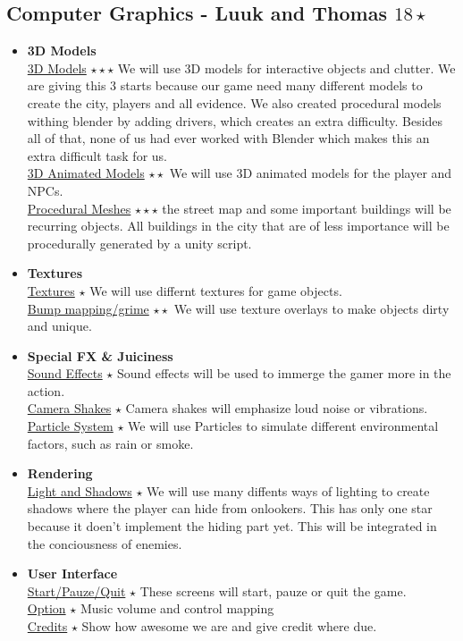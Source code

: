 \documentclass{article}
\begin{document}
		\subsection{Computer Graphics - Luuk and Thomas $18 \star$}
			\begin{itemize}
				\item \textbf{3D Models}\\
					\underline{3D Models} $\star \star \star$ We will use 3D models for interactive objects and clutter. We are giving this 3 starts because our game need many different models to create the city, players and all evidence. We also created procedural models withing blender by adding drivers, which creates an extra difficulty. Besides all of that, none of us had ever worked with Blender which makes this an extra difficult task for us.\\
					\underline{3D Animated Models} $\star \star$  We will use 3D animated models for the player and NPCs.\\
					\underline{Procedural Meshes} $\star \star \star$  the street map and some important buildings will be recurring objects. All buildings in the city that are of less importance will be procedurally generated by a unity script.
				\item \textbf{Textures}\\
					\underline{Textures} $\star$ We will use differnt textures for game objects.\\
					\underline{Bump mapping/grime} $\star \star$ We will use texture overlays to make objects dirty and unique.
				\item \textbf{Special FX \& Juiciness}\\
					\underline{Sound Effects} $\star$ Sound effects will be used to immerge the gamer more in the action.\\
					\underline{Camera Shakes} $\star$ Camera shakes will emphasize loud noise or vibrations.\\
					\underline{Particle System} $\star$ We will use Particles to simulate different environmental factors, such as rain or smoke.
				\item \textbf{Rendering}\\
					\underline{Light and Shadows} $\star$  We will use many diffents ways of lighting to create shadows where the player can hide from onlookers. This has only one star because it doen't implement the hiding part yet. This will be integrated in the conciousness of enemies.
				\item \textbf{User Interface}\\
					\underline{Start/Pauze/Quit} $\star$ These screens will start, pauze or quit the game.\\
					\underline{Option} $\star$ Music volume and control mapping\\
					\underline{Credits} $\star$ Show how awesome we are and give credit where due.
			\end{itemize}
\end{document}
